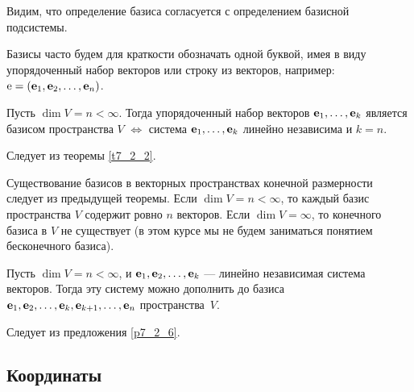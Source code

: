 

Видим, что определение базиса согласуется с определением базисной подсистемы.

Базисы часто будем для краткости обозначать одной буквой, имея в виду упорядоченный набор векторов или 
строку из векторов, например: $\mathrm{e} = (\mathbf{e}_1, \mathbf{e}_2, \ldots, \mathbf{e}_n)$.

\begin{theor}\label{t7_3_1}
Пусть $\dim V = n< \infty$. Тогда 
упорядоченный набор векторов  $\mathbf{e}_1, \ldots , \mathbf{e}_k$ является базисом пространства $V$
$\Leftrightarrow$ система $\mathbf{e}_1, \ldots , \mathbf{e}_k$ линейно независима и  $k=n$.
\end{theor}
\dok Следует из теоремы \ref{t7_2_2}.
\edok
\otstup

Существование базисов в векторных пространствах конечной размерности
следует из предыдущей теоремы. Если $\dim V = n<\infty$, то каждый базис пространства $V$
содержит ровно $n$ векторов.
Если $\dim V = \infty$, то конечного базиса в $V$ не существует
(в этом курсе мы не будем заниматься понятием бесконечного базиса).


\begin{predl}\label{p7_3_1}
Пусть $\dim V = n < \infty$, и
$\mathbf{e}_1, \mathbf{e}_2, \ldots , \mathbf{e}_k$ --- линейно независимая система векторов.
Тогда эту систему можно дополнить до
базиса $\mathbf{e}_1, \mathbf{e}_2, \ldots , \mathbf{e}_k, \mathbf{e}_{k+1}, \ldots , \mathbf{e}_n$
пространства~$V$.
\end{predl}
\dok
Следует из предложения \ref{p7_2_6}.
\edok

\otstup

\subsection{Координаты}

